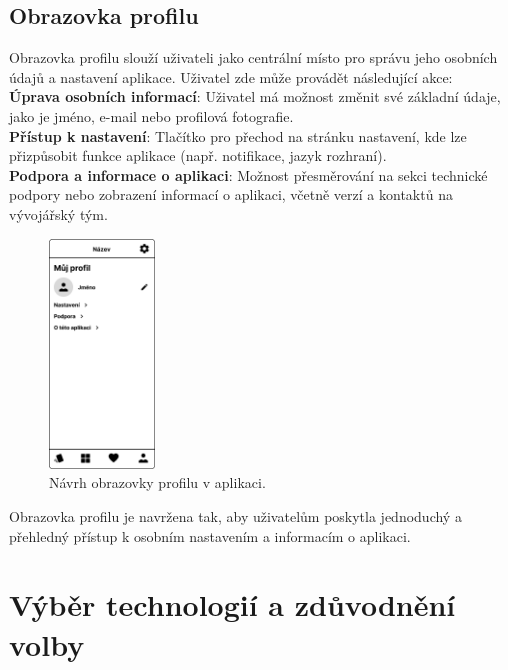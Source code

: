 \documentclass[12pt,a4paper]{report}
\begin{document}
\newpage

\subsection{Obrazovka profilu}

Obrazovka profilu slouží uživateli jako centrální místo pro správu jeho osobních údajů a nastavení aplikace. Uživatel zde může provádět následující akce:\\

\noindent \textbf{Úprava osobních informací}: Uživatel má možnost změnit své základní údaje, jako je jméno, e-mail nebo profilová fotografie.\\

\noindent \textbf{Přístup k nastavení}: Tlačítko pro přechod na stránku nastavení, kde lze přizpůsobit funkce aplikace (např. notifikace, jazyk rozhraní).\\

\noindent \textbf{Podpora a informace o aplikaci}: Možnost přesměrování na sekci technické podpory nebo zobrazení informací o aplikaci, včetně verzí a kontaktů na vývojářský tým.\\

\begin{figure}[h!]
    \centering
    \includegraphics[width=0.25\textwidth]{img/account.png}
    \caption{Návrh obrazovky profilu v aplikaci.}
    \label{fig:profile_screen}
\end{figure}

Obrazovka profilu je navržena tak, aby uživatelům poskytla jednoduchý a přehledný přístup k osobním nastavením a informacím o aplikaci.

\newpage

\section{Výběr technologií a zdůvodnění volby}
\end{document}
